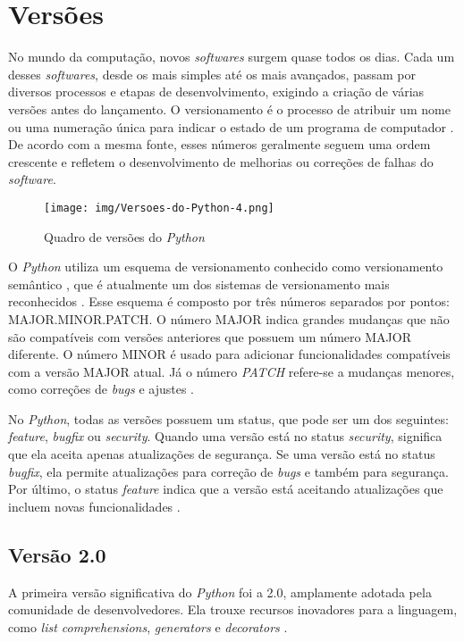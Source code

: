 
\section{Versões}

No mundo da computação, novos \textit{softwares} surgem quase todos os dias. Cada um desses \textit{softwares}, desde os mais simples até os mais avançados, passam por diversos processos e etapas de desenvolvimento, exigindo a criação de várias versões antes do lançamento. O versionamento é o processo de atribuir um nome ou uma numeração única para indicar o estado de um programa de computador \cite{wikipedia_versionamento}. De acordo com a mesma fonte, esses números geralmente seguem uma ordem crescente e refletem o desenvolvimento de melhorias ou correções de falhas do \textit{software}.

\begin{figure}
    \centering
    \texttt{[image: img/Versoes-do-Python-4.png]}
    \caption{Quadro de versões do \textit{Python} \cite{hashtagtreinamentos_python_versions}}
    \label{fig:enter-label}
\end{figure}

O \textit{Python} utiliza um esquema de versionamento conhecido como versionamento semântico \cite{hashtagtreinamentos_python_versions}, que é atualmente um dos sistemas de versionamento mais reconhecidos \cite{wikipedia_versionamento}. Esse esquema é composto por três números separados por pontos: MAJOR.MINOR.PATCH. O número MAJOR indica grandes mudanças que não são compatíveis com versões anteriores que possuem um número MAJOR diferente. O número MINOR é usado para adicionar funcionalidades compatíveis com a versão MAJOR atual. Já o número \textit{PATCH} refere-se a mudanças menores, como correções de \textit{bugs} e ajustes \cite{wikipedia_versionamento}.

No \textit{Python}, todas as versões possuem um status, que pode ser um dos seguintes: \textit{feature}, \textit{bugfix} ou \textit{security}. Quando uma versão está no status \textit{security}, significa que ela aceita apenas atualizações de segurança. Se uma versão está no status \textit{bugfix}, ela permite atualizações para correção de \textit{bugs} e também para segurança. Por último, o status \textit{feature} indica que a versão está aceitando atualizações que incluem novas funcionalidades \cite{hashtagtreinamentos_python_versions}.


\subsection{Versão 2.0}
A primeira versão significativa do \textit{Python} foi a 2.0, amplamente adotada pela comunidade de desenvolvedores. Ela trouxe recursos inovadores para a linguagem, como \textit{list comprehensions}, \textit{generators} e \textit{decorators} \cite{awari_python_version}.

